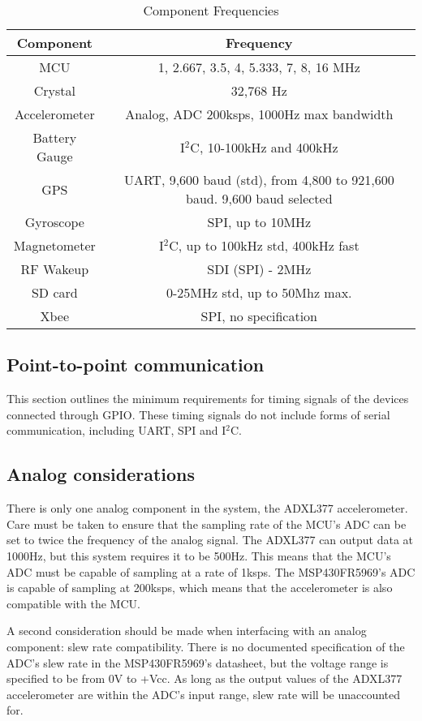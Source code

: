 \begin{table}[H]
  \centering
  \caption{Component Frequencies}
    \begin{tabular}{|c|c|}
    \hline
    Component & Frequency \\
    \hline \hline
    MCU   & 1, 2.667, 3.5, 4, 5.333, 7, 8, 16 MHz \\ \hline
    Crystal & 32,768 Hz \\ \hline
    Accelerometer & Analog, ADC 200ksps, 1000Hz max bandwidth \\ \hline
    Battery Gauge & I$^2$C, 10-100kHz and 400kHz \\ \hline
    GPS   & UART, 9,600 baud (std), from 4,800 to 921,600 baud. 9,600 baud selected\\ \hline
    Gyroscope & SPI, up to 10MHz \\ \hline
    Magnetometer & I$^2$C, up to 100kHz std, 400kHz fast \\ \hline
    RF Wakeup & SDI (SPI) - 2MHz \\ \hline
    SD card & 0-25MHz std, up to 50Mhz max. \\ \hline
    Xbee  & SPI, no specification \\ \hline
    \end{tabular}
  \label{tab:compFreq}
\end{table}

\subsection{Point-to-point communication}
This section outlines the minimum requirements for timing signals of the devices connected through GPIO. These timing signals do not include forms of serial communication, including UART, SPI and I$^2$C.


\subsection{Analog considerations}
There is only one analog component in the system, the ADXL377 accelerometer. Care must be taken to ensure that the sampling rate of the MCU's ADC can be set to twice the frequency of the analog signal. The ADXL377 can output data at 1000Hz, but this system requires it to be 500Hz. This means that the MCU's ADC must be capable of sampling at a rate of 1ksps. The MSP430FR5969's ADC is capable of sampling at 200ksps, which means that the accelerometer is also compatible with the MCU.

A second consideration should be made when interfacing with an analog component: slew rate compatibility. There is no documented specification of the ADC's slew rate in the MSP430FR5969's datasheet, but the voltage range is specified to be from 0V to +Vcc. As long as the output values of the ADXL377 accelerometer are within the ADC's input range, slew rate will be unaccounted for.


